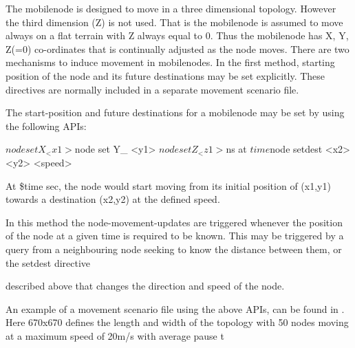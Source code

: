 The mobilenode is designed to move in a three dimensional topology. However the third dimension (Z) is not used. That is the mobilenode is assumed to move always on a flat terrain with Z always equal to 0.
Thus the mobilenode has X, Y, Z(=0) co-ordinates that is continually adjusted as the node moves. There are two mechanisms to induce movement in mobilenodes. 
In the first method, starting position of the node and its future destinations may be set explicitly. These directives are normally included in a separate movement scenario file. 

The start-position and future destinations for a mobilenode may be set by using the following APIs:

\begin{program}

$node set X_ <x1>
$node set Y_ <y1>
$node set Z_ <z1>

$ns at $time $node setdest <x2> <y2> <speed>
\end{program}
At \$time sec, the node would start moving from its initial position 
of (x1,y1) towards a destination (x2,y2) at the defined speed.

In this method the node-movement-updates are triggered whenever the position of the node at a given time is required to be known. This may be triggered by a query from a neighbouring node seeking to know the distance between them, or the setdest directive






















 described above that changes the direction and speed of the node.

An example of a movement scenario file using the above APIs, can be found in . Here 670x670 defines the length and width of the topology with 50 nodes moving at a maximum speed of 20m/s with average pause t






















